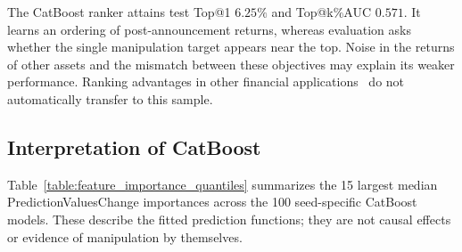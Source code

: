 \documentclass{ieeeaccess}
\begin{document}
The CatBoost ranker attains test Top@1 $6.25\%$ and Top@k\%AUC $0.571$. It learns an ordering of post-announcement returns, whereas evaluation asks whether the single manipulation target appears near the top. Noise in the returns of other assets and the mismatch between these objectives may explain its weaker performance. Ranking advantages in other financial applications~\cite{poh_ltr} do not automatically transfer to this sample.

\subsection{Interpretation of CatBoost}
Table~\ref{table:feature_importance_quantiles} summarizes the 15 largest median PredictionValuesChange importances across the 100 seed-specific CatBoost models. These describe the fitted prediction functions; they are not causal effects or evidence of manipulation by themselves.

\begin{table}[!tbp]
    \centering
    \small
    \setlength{\tabcolsep}{5pt}
    \renewcommand{\arraystretch}{1.15}
    \caption{CatBoost PredictionValuesChange quantiles across 100 seed-specific fits on the same 290 training events. Rows are ordered by median importance.}
    \label{table:feature_importance_quantiles}
\end{table}
\end{document}
